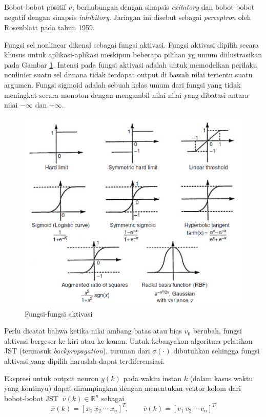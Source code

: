 Bobot-bobot positif  $v_j$ berhubungan dengan sinapsis \textit{exitatory} dan bobot-bobot negatif dengan sinapsis \textit{inhibitory}. Jaringan ini disebut sebagai \textit{perceptron} oleh Rosenblatt pada tahun 1959. \cite{NNControlBook}

Fungsi sel nonlinear dikenal sebagai fungsi aktivasi. Fungsi aktivasi dipilih secara khusus untuk aplikasi-aplikasi meskipun beberapa pilihan yg umum diilustrasikan pada Gambar \ref{fig:3:activation}. Intensi pada fungsi aktivasi adalah untuk memodelkan perilaku nonlinier suatu sel dimana tidak terdapat output di bawah nilai tertentu suatu argumen. Fungsi sigmoid adalah sebuah kelas umum dari fungsi yang tidak meningkat secara monoton dengan mengambil nilai-nilai yang dibatasi antara nilai $-\infty$ dan $+\infty$. 
\begin{figure}[!h]
	\centering
	\includegraphics[width=1\textwidth]{figures/activationFunction}
	\caption{Fungsi-fungsi aktivasi \cite{NNControlBook}}
	\label{fig:3:activation}
\end{figure}
Perlu dicatat bahwa ketika nilai ambang batas atau bias $v_0$ berubah, fungsi aktivasi bergeser ke kiri atau ke kanan. Untuk kebanyakan algoritma pelatihan JST (termasuk \textit{backpropagation}), turunan dari $\sigma(\cdot)$ dibutuhkan sehingga fungsi aktivasi yang dipilih haruslah dapat terdiferensiasi.\cite{NNControlBook}

Ekspresi untuk output neuron $y(k)$ pada waktu instan $k$ (dalam kasus waktu yang kontinyu) dapat dirampingkan dengan menentukan vektor kolom dari bobot-bobot JST $\ \overline{v}(k) \in \mathbb{R}^n $ sebagai
\vspace{-1em}
\begin{equation} \label{eq:3:vektorKolom}
\overline{x}(k) = [x_1\ x_2\ \cdots\ x_n]^T, \qquad \overline{v}(k) = [v_1\ v_2\ \cdots\ v_n]^T
\end{equation}


